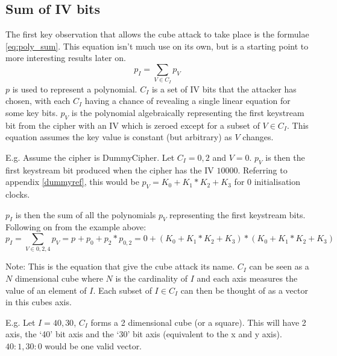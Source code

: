 \documentclass{report}
\let\Oldsubsection\subsection
\renewcommand{\subsection}{\FloatBarrier\Oldsubsection}
\begin{document}
\subsection{Sum of IV bits}
The first key observation that allows the cube attack to take place is the formulae \ref{eq:poly_sum}. This equation isn't much use on its own, but is a starting point to more interesting results later on.
\begin{equation} \label{eq:poly_sum}
p_I = \sum\limits_{V \in C_I} p_V
\end{equation}
$p$ is used to represent a polynomial. $C_I$ is a set of IV bits that the attacker has chosen, with each $C_I$ having a chance of revealing a single linear equation for some key bits.
$p_V$ is the polynomial algebraically representing the first keystream bit from the cipher with an IV which is zeroed except for a subset of $V\in C_I$. This equation assumes the key value is constant (but arbitrary) as $V$ changes.

E.g. Assume the cipher is DummyCipher. Let $C_I = {0,2}$ and $V = {0}$. $p_V$ is then the first keystream bit produced when the cipher has the IV $10000$. Referring to appendix \ref{dummyref}, this would be $p_V = K_0+K_1*K_2+K_3$ for 0 initialisation clocks.

$p_I$ is then the sum of all the polynomials $p_V$ representing the first keystream bits. Following on from the example above:
\begin{equation}\label{eq:poly_sum_eg}
p_I = \sum\limits_{V \in {0,2,4}} p_V  = p_{} + p_{0}+p_2*p_{0,2} = 0+(K_0+K_1*K_2+K_3)*(K_0+K_1*K_2+K_3)
\end{equation}

Note: This is the equation that give the cube attack its name. $C_I$ can be seen as a $N$ dimensional cube where $N$ is the cardinality of $I$ and each axis measures the value of an element of $I$. Each subset of $I \in C_I$ can then be thought of as a vector in this cubes axis.

E.g. Let $I = {40, 30}$, $C_I$ forms a 2 dimensional cube (or a square). This will have 2 axis, the `40' bit axis and the `30' bit axis (equivalent to the x and y axis). ${40:1, 30:0}$ would be one valid vector.

\begin{figure}[h]
\end{figure}
\end{document}

